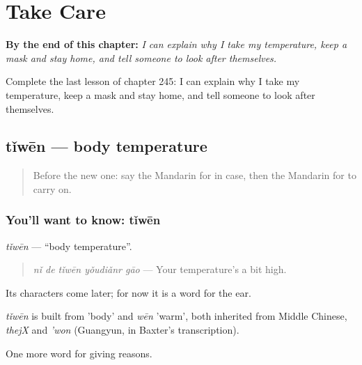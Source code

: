 
\chapter{Take Care}
\label{ch:zh-take-care}

\begin{chapteropening}
\textbf{By the end of this chapter:} \emph{I can explain why I take my temperature, keep a mask and stay home, and tell someone to look after themselves.}

Complete the last lesson of chapter 245: I can explain why I take my temperature, keep a mask and stay home, and tell someone to look after themselves.
\end{chapteropening}

\section[tǐwēn]{tǐwēn — body temperature}

\label{lesson:ZH-C245-tiwen}



\begin{quote}
Before the new one: say the Mandarin for in case, then the Mandarin for to carry on.
\end{quote}

\subsection*{You'll want to know: tǐwēn}
\emph{tǐwēn} — \textquotedblleft{}body temperature\textquotedblright{}.

\begin{quote}
\emph{nǐ de tǐwēn yǒudiǎnr gāo} — Your temperature's a bit high.
\end{quote}

Its characters come later; for now it is a word for the ear.

\begin{cousinweb}
\emph{tǐwēn} is built from  'body' and \emph{wēn} 'warm', both inherited from Middle Chinese, \emph{thejX} and \emph{'won} (Guangyun, in Baxter's transcription).
\end{cousinweb}

\begin{grammarlens}[title={What you've built}]
One more word for giving reasons.
\end{grammarlens}

